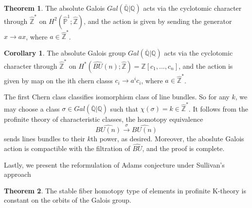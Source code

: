 \documentclass{article}
\theoremstyle{definition}
\newtheorem{theorem}{Theorem}[section]
\theoremstyle{definition}
\theoremstyle{definition}
\theoremstyle{definition}
\theoremstyle{definition}
\theoremstyle{definition}
\newtheorem{corollary}{Corollary}[theorem]
\theoremstyle{definition}
\begin{document}
\begin{tcolorbox}[colback=red!5!white,colframe=red!30!white]
\begin{theorem}
The absolute Galois $Gal(\overline{\mathbb{Q}}|\mathbb{Q})$ acts via the cyclotomic character through $\widehat{\mathbb{Z}}^*$ on $H^2(\widehat{\mathbb{P}}^1;\widehat{\mathbb{Z}})$, and the action is given by sending the generator $x\to ax$, where $a\in \widehat{\mathbb{Z}}^*$.
\end{theorem}
\end{tcolorbox}


\begin{tcolorbox}[colback=green!5!white,colframe=green!30!white]
\begin{corollary}
	The absolute Galois group $Gal(\overline{\mathbb{Q}}|\mathbb{Q})$ acts via the cyclotomic character through $\widehat{\mathbb{Z}}^*$ on $H^*(\widehat{BU}(n);\widehat{\mathbb{Z}})=\widehat{\mathbb{Z}}[c_1,...,c_n]$, and the action is given by map on the ith chern classs $c_i\to a^ic_i$, where $a\in \widehat{\mathbb{Z}}^*$.
\end{corollary}
\end{tcolorbox}
The first Chern class classifies isomorphism class of line bundles. So for any $k$, we may choose a class $\sigma\in Gal(\overline{\mathbb{Q}}|\mathbb{Q})$ such that $\chi(\sigma)=k\in \widehat{\mathbb{Z}}^*$. It follows from the profinite theory of characteristic classes, the homotopy equivalence 
\[\widehat{BU(n)}\xrightarrow{\sigma} \widehat{BU(n)}\]
sends lines bundles to their $k$th power, as desired. Moreover, the aboslute Galois action is compactible with the filtration of $\widehat{BU}$, and the proof is complete.

Lastly, we present the reformulation of Adams conjecture under Sullivan's approach

\begin{tcolorbox}[colback=red!5!white,colframe=red!30!white]
\begin{theorem}
	The stable fiber homotopy type of elements in profinite K-theory is constant on the orbits of the Galois group.
\end{theorem}
\end{tcolorbox}
\end{document}
